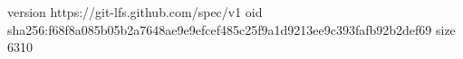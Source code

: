 version https://git-lfs.github.com/spec/v1
oid sha256:f68f8a085b05b2a7648ae9e9efcef485c25f9a1d9213ee9c393fafb92b2def69
size 6310
